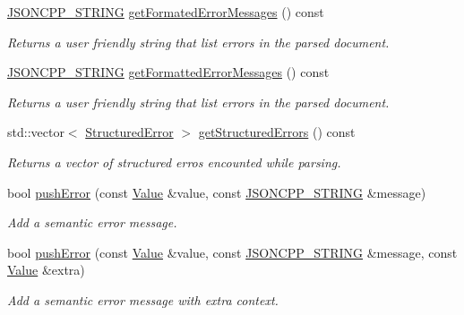 \begin{DoxyCompactItemize}
\hyperlink{config_8h_a1e723f95759de062585bc4a8fd3fa4be}{J\+S\+O\+N\+C\+P\+P\+\_\+\+S\+T\+R\+I\+NG} \hyperlink{class_json_1_1_reader_a791cbc5afd1bef1631e07239dc452c79}{get\+Formated\+Error\+Messages} () const
\begin{DoxyCompactList}\small\item\em Returns a user friendly string that list errors in the parsed document. \end{DoxyCompactList}\item 
\hyperlink{config_8h_a1e723f95759de062585bc4a8fd3fa4be}{J\+S\+O\+N\+C\+P\+P\+\_\+\+S\+T\+R\+I\+NG} \hyperlink{class_json_1_1_reader_ae638a7b1f36f7ccf99ba89fa36ccf222}{get\+Formatted\+Error\+Messages} () const
\begin{DoxyCompactList}\small\item\em Returns a user friendly string that list errors in the parsed document. \end{DoxyCompactList}\item 
std\+::vector$<$ \hyperlink{struct_json_1_1_reader_1_1_structured_error}{Structured\+Error} $>$ \hyperlink{class_json_1_1_reader_ae3d714e95bd98b27e296c607e408189b}{get\+Structured\+Errors} () const
\begin{DoxyCompactList}\small\item\em Returns a vector of structured erros encounted while parsing. \end{DoxyCompactList}\item 
bool \hyperlink{class_json_1_1_reader_af5fa7099083f01706635ade1d0f8ddb5}{push\+Error} (const \hyperlink{class_json_1_1_value}{Value} \&value, const \hyperlink{config_8h_a1e723f95759de062585bc4a8fd3fa4be}{J\+S\+O\+N\+C\+P\+P\+\_\+\+S\+T\+R\+I\+NG} \&message)
\begin{DoxyCompactList}\small\item\em Add a semantic error message. \end{DoxyCompactList}\item 
bool \hyperlink{class_json_1_1_reader_a3568be9db568ff57bd3fcc373143dff3}{push\+Error} (const \hyperlink{class_json_1_1_value}{Value} \&value, const \hyperlink{config_8h_a1e723f95759de062585bc4a8fd3fa4be}{J\+S\+O\+N\+C\+P\+P\+\_\+\+S\+T\+R\+I\+NG} \&message, const \hyperlink{class_json_1_1_value}{Value} \&extra)
\begin{DoxyCompactList}\small\item\em Add a semantic error message with extra context. \end{DoxyCompactList}\item 

\end{DoxyCompactItemize}
